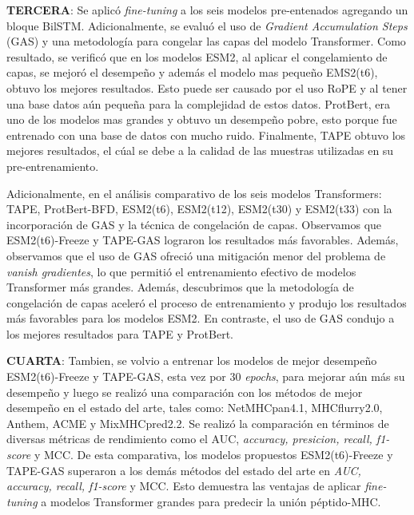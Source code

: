 \textbf{TERCERA}: Se aplicó \textit{fine-tuning} a los seis modelos pre-entenados agregando un bloque BilSTM. Adicionalmente, se evaluó el uso de \textit{Gradient Accumulation Steps} (GAS) y una metodología para congelar las capas del modelo Transformer. Como resultado, se verificó que en los modelos ESM2, al aplicar el congelamiento de capas, se mejoró el desempeño y además el modelo mas pequeño EMS2(t6), obtuvo los mejores resultados. Esto puede ser causado por el uso RoPE y al tener una base datos aún pequeña para la complejidad de estos datos. ProtBert, era uno de los modelos mas grandes y obtuvo un desempeño pobre, esto porque fue entrenado con una base de datos con mucho ruido. Finalmente, TAPE obtuvo los mejores resultados, el cúal se debe a la calidad de las muestras utilizadas en su pre-entrenamiento.


Adicionalmente, en el análisis comparativo de los seis modelos Transformers: TAPE, ProtBert-BFD, ESM2(t6), ESM2(t12), ESM2(t30) y ESM2(t33) con la incorporación de GAS y la técnica de congelación de capas. Observamos que ESM2(t6)-Freeze y TAPE-GAS lograron los resultados más favorables. Además, observamos que el uso de GAS ofreció una mitigación menor del problema de \textit{vanish gradientes}, lo que permitió el entrenamiento efectivo de modelos Transformer más grandes. Además, descubrimos que la metodología de congelación de capas aceleró el proceso de entrenamiento y produjo los resultados más favorables para los modelos ESM2. En contraste, el uso de GAS condujo a los mejores resultados para TAPE y ProtBert.

\textbf{CUARTA}: Tambien, se volvio a entrenar los modelos de mejor desempeño ESM2(t6)-Freeze y TAPE-GAS, esta vez por 30 \textit{epochs}, para mejorar aún más su desempeño y luego se realizó una comparación con los métodos de mejor desempeño en el estado del arte, tales como: NetMHCpan4.1, MHCflurry2.0, Anthem, ACME y MixMHCpred2.2. Se realizó la comparación en términos de diversas métricas de rendimiento como el AUC, \textit{accuracy, presicion, recall, f1-score} y MCC. De esta comparativa, los modelos propuestos ESM2(t6)-Freeze y TAPE-GAS superaron a los demás métodos del estado del arte en \textit{AUC, accuracy, recall, f1-score} y MCC. Esto demuestra las ventajas de aplicar \textit{fine-tuning} a modelos Transformer grandes para predecir la unión péptido-MHC.






